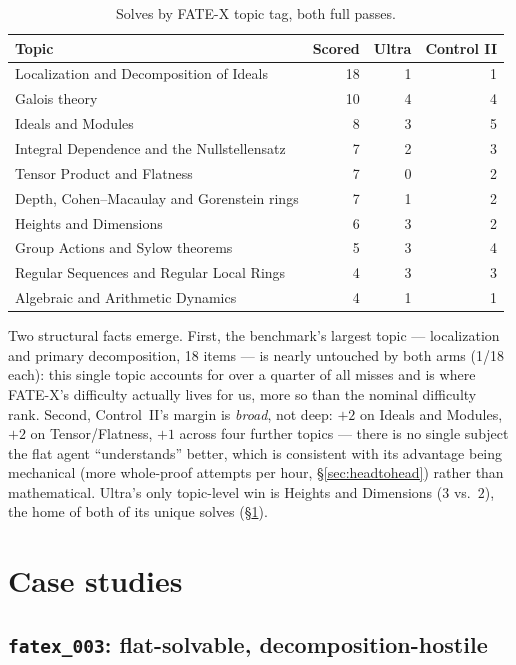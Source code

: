 \documentclass[12pt, a4paper]{article}
\newcommand{\run}[1]{\texttt{#1}}
\begin{document}
\begin{table}[H]
\centering\small
\caption{Solves by FATE-X topic tag, both full passes.}
\label{tab:topics}
\begin{tabular}{@{}lrrr@{}}
\toprule
Topic & Scored & Ultra & Control II \\
\midrule
Localization and Decomposition of Ideals & 18 & 1 & 1 \\
Galois theory & 10 & 4 & 4 \\
Ideals and Modules & 8 & 3 & 5 \\
Integral Dependence and the Nullstellensatz & 7 & 2 & 3 \\
Tensor Product and Flatness & 7 & 0 & 2 \\
Depth, Cohen--Macaulay and Gorenstein rings & 7 & 1 & 2 \\
Heights and Dimensions & 6 & 3 & 2 \\
Group Actions and Sylow theorems & 5 & 3 & 4 \\
Regular Sequences and Regular Local Rings & 4 & 3 & 3 \\
Algebraic and Arithmetic Dynamics & 4 & 1 & 1 \\
\bottomrule
\end{tabular}
\end{table}

Two structural facts emerge. First, the benchmark's largest topic ---
localization and primary decomposition, 18 items --- is nearly untouched by
both arms (1/18 each): this single topic accounts for over a quarter of all
misses and is where FATE-X's difficulty actually lives for us, more so than
the nominal difficulty rank. Second, Control~II's margin is \emph{broad},
not deep: $+2$ on Ideals and Modules, $+2$ on Tensor/Flatness, $+1$ across
four further topics --- there is no single subject the flat agent
``understands'' better, which is consistent with its advantage being
mechanical (more whole-proof attempts per hour, \S\ref{sec:headtohead})
rather than mathematical. Ultra's only topic-level win is Heights and
Dimensions ($3$ vs.\ $2$), the home of both of its unique solves
(\S\ref{sec:cases}).

\section{Case studies}
\label{sec:cases}

\subsection{\run{fatex\_003}: flat-solvable, decomposition-hostile}
\label{sec:fatex003}
\end{document}
